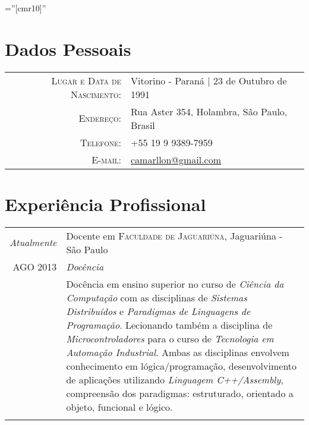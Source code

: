 \documentclass[a4paper,10pt]{article} %
\begin{document}
\pagestyle{empty} %

\font\fb=''[cmr10]'' %

\begin{samepage}
\par{\bigskip\par} %

\section{Dados Pessoais}

\begin{tabular}{rl}
\textsc{Lugar e Data de Nascimento:} & Vitorino - Paraná | 23 de Outubro de 1991 \\
\textsc{Endereço:} & Rua Aster 354, Holambra, São Paulo, Brasil\\
\textsc{Telefone:} & +55 19 9 9389-7959\\
\textsc{E-mail:} & \href{mailto:camarllon@gmail.com}{camarllon@gmail.com}
\end{tabular}


\section{Experiência Profissional}

\begin{tabular}{r|p{11cm}}

\emph{Atualmente} & Docente em \textsc{Faculdade de Jaguariúna}, Jaguariúna - São Paulo \emph{} \\
  \textsc{AGO 2013} & \emph{Docência}\\ 
                    & \footnotesize{Docência em ensino superior no curso de \textit{Ciência da Computação} com as disciplinas de \textit{Sistemas Distribuídos} e \textit{Paradigmas de Linguagens de Programação}. Lecionando também a disciplina de \textit{Microcontroladores} para o curso de \textit{Tecnologia em Automação Industrial}. Ambas as disciplinas envolvem conhecimento em lógica/programação, desenvolvimento de aplicações utilizando \emph{Linguagem C++/Assembly}, compreensão dos paradigmas: estruturado, orientado a objeto, funcional e lógico.}\\
\multicolumn{2}{c}{} \\


\end{tabular}
\end{samepage}
\end{document}
